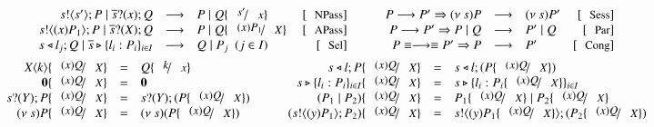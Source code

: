 \begin{figure}[t!]
\[
	\begin{array}{c}
		\begin{array}{rclrcrclr}
			\bout{s}{s'} P \Par \binp{\dual{s}}{x} Q & \red & P \Par Q \subst{s'}{x} & \orule{NPass} & \quad & P \red P' \Rightarrow \news{s} P & \red & \news{s} P'  & \orule{Sess}\\
			\bout{s}{\abs{x}{P_1}} P \Par \binp{\dual{s}}{\X} Q & \red & P \Par Q \subst{\abs{x}{P_1}}{\X}\ & \orule{APass} & & P \red P' \Rightarrow   P \Par Q & \red &  P' \Par Q  & \orule{Par} \\
			\bsel{s}{l_j} Q \Par \bbra{\dual{s}}{l_i : P_i}_{i \in I} & \red & Q \Par P_j ~~(j \in I)~~  & \orule{Sel} & & P \scong \red \scong P' \Rightarrow P & \red & P' & \orule{Cong}
		\end{array}
		\vspace{2mm} \\
		\begin{array}{rclcrcl}
			\appl{X}{k} \subst{\abs{x}{Q}}{\X} & = & Q \subst{k}{x} & \quad & \bsel{s}{l} P \subst{\abs{x}{Q}}{\X} & = & \bsel{s}{l} (P \subst{\abs{x}{Q}}{\X})\\
			\inact \subst{\abs{x}{Q}}{\X} & = & \inact & & \bbra{s}{l_i : P_i}_{i \in I} \subst{\abs{x}{Q}}{\X} & = & \bbra{s}{l_i : P_i \subst{\abs{x}{Q}}{\X}}_{i \in I} 
			\\
			\binp{s}{\Y} P \subst{\abs{x}{Q}}{\X} & = &  \binp{s}{\Y} (P \subst{\abs{x}{Q}}{\X}) & & (P_1 \Par P_2) \subst{\abs{x}{Q}}{\X} & = & P_1 \subst{\abs{x}{Q}}{\X} \Par P_2 \subst{\abs{x}{Q}}{\X}
			\\
			\news{s} P \subst{\abs{x}{Q}}{\X} & = & \news{s} (P \subst{\abs{x}{Q}}{\X})  & & (\bout{s}{\abs{y}{P_1}} P_2) \subst{\abs{x}{Q}}{\X} & = & \bout{s}{\abs{y}{P_1 \subst{\abs{x}{Q}}{\X}}} (P_2 \subst{\abs{x}{Q}}{\X})

\end{array}
\end{array}\]
\end{figure}
